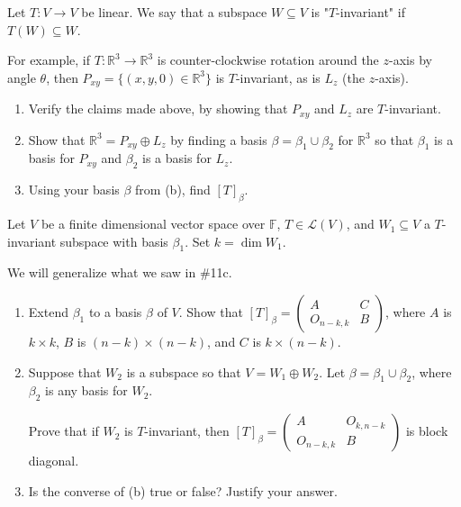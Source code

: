 \documentclass{eh-homework}
\begin{document}
    \begin{question}{11}
        Let \( T : V \to V \) be linear. We say that a subspace \( W \subseteq V \) is "\( T \)-invariant" if \( T(W) \subseteq W \).

        For example, if \( T : \mathbb{R}^3 \to \mathbb{R}^3 \) is counter-clockwise rotation around the \( z \)-axis by angle \( \theta \), then \( P_{xy} = \{(x, y, 0) \in \mathbb{R}^3\} \) is \( T \)-invariant, as is \( L_z \) (the \( z \)-axis).

        \begin{enumerate}
            \item Verify the claims made above, by showing that \( P_{xy} \) and \( L_z \) are \( T \)-invariant.
            \item Show that \( \mathbb{R}^3 = P_{xy} \oplus L_z \) by finding a basis \( \beta = \beta_1 \cup \beta_2 \) for \( \mathbb{R}^3 \) so that \( \beta_1 \) is a basis for \( P_{xy} \) and \( \beta_2 \) is a basis for \( L_z \).
            \item Using your basis \( \beta \) from (b), find \( [T]_\beta \).
        \end{enumerate}
    \end{question}

    \begin{question}{12}
        Let \( V \) be a finite dimensional vector space over \( \mathbb{F} \), \( T \in \mathcal{L}(V) \), and \( W_1 \subseteq V \) a \( T \)-invariant subspace with basis \( \beta_1 \). Set \( k = \dim W_1 \).

        We will generalize what we saw in \#11c.

        \begin{enumerate}
            \item Extend \( \beta_1 \) to a basis \( \beta \) of \( V \). Show that \( [T]_\beta = \begin{pmatrix} A & C \\ O_{n-k,k} & B \end{pmatrix} \), where \( A \) is \( k \times k \), \( B \) is \( (n-k) \times (n-k) \), and \( C \) is \( k \times (n-k) \).
            \item Suppose that \( W_2 \) is a subspace so that \( V = W_1 \oplus W_2 \). Let \( \beta = \beta_1 \cup \beta_2 \), where \( \beta_2 \) is any basis for \( W_2 \).

            Prove that if \( W_2 \) is \( T \)-invariant, then \( [T]_\beta = \begin{pmatrix} A & O_{k,n-k} \\ O_{n-k,k} & B \end{pmatrix} \) is block diagonal.
            \item Is the converse of (b) true or false? Justify your answer.
        \end{enumerate}
    \end{question}
\end{document}
